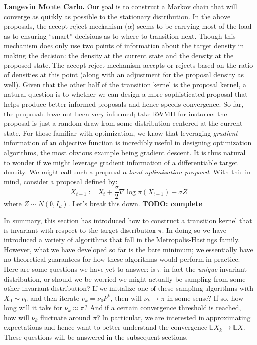 \documentclass[12pt]{article}
\newcommand{\E}{\mathbb{E}}
\begin{document}
\textbf{Langevin Monte Carlo.} Our goal is to construct a Markov chain that will converge as quickly as possible to the stationary distribution. In the above proposals, the 
accept-reject mechanism ($\alpha$) seems to be carrying most of the load as to ensuring ``smart'' decisions as to where to transition next. Though this mechanism does 
only use two points of information about the target density in making the decision: the density at the current state and the density at the proposed state. The accept-reject 
mechanism accepts or rejects based on the ratio of densities at this point (along with an adjustment for the proposal density as well). Given that the other half of the 
transition kernel is the proposal kernel, a natural question is to whether we can design a more sophisticated proposal that helps produce better informed proposals and 
hence speeds convergence. So far, the proposals have not been very informed; take RWMH for instance: the proposal is just a random draw from some distribution 
centered at the current state. For those familiar with optimization, we know that leveraging \textit{gradient} information of an objective function is incredibly 
useful in designing optimization algorithms, the most obvious example being gradient descent. It is thus natural to wonder if we might leverage gradient information 
of a differentiable target density. We might call such a proposal a \textit{local optimization proposal}. With this in mind, consider a proposal defined by: 
\[X_{t + 1} := X_{t} + \frac{\sigma}{2} \nabla \log \pi(X_{t - 1}) + \sigma Z\]
where $Z \sim N(0, I_d)$. Let's break this down. \textbf{TODO: complete}


In summary, this section has introduced how to construct a transition kernel that is invariant with respect to the target distribution $\pi$. In doing so we have introduced 
a variety of algorithms that fall in the Metropolis-Hastings family. However, what we have developed so far is the bare minimum; we essentially have no theoretical guarantees
for how these algorithms would perform in practice. Here are some questions we have yet to answer: is $\pi$ in fact the \textit{unique} invariant distribution, or should we be worried
we might actually be sampling from some other invariant distribution? If we initialize one of these sampling algorithms with $X_0 \sim \nu_0$ and then iterate 
$\nu_{k} = \nu_0 P^k$, then will $\nu_k \to \pi$ in some sense? If so, how long will it take for $\nu_k \approx \pi$? And if a certain convergence threshold is reached, how will 
$\nu_k$ fluctuate around $\pi$? In particular, we are interested in approximating expectations and hence want to better understand the convergence
$\E X_k \to \E X$. These questions will be answered in the subsequent sections. 
\end{document}

